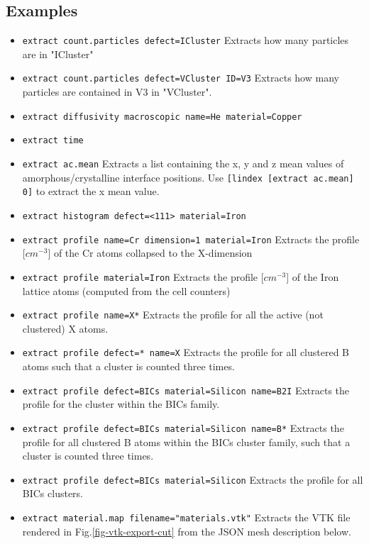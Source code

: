 \subsection{Examples}
\begin{itemize}
\item \verb+extract count.particles defect=ICluster+ Extracts how many particles are in "ICluster"
\item \verb+extract count.particles defect=VCluster ID=V3+ Extracts how many particles are contained in V3 in "VCluster".
\item \verb+extract diffusivity macroscopic name=He material=Copper+
\item \verb+extract time+
\item \verb+extract ac.mean+ Extracts a list containing the x, y and z mean values of amorphous/crystalline interface positions. Use \verb+[lindex [extract ac.mean] 0]+ to extract the x mean value.
\item \verb+extract histogram defect=<111> material=Iron+ 
\item \verb+extract profile name=Cr dimension=1 material=Iron+ Extracts the profile [$cm^{-3}$] of the Cr atoms collapsed to the X-dimension
\item \verb+extract profile material=Iron+ Extracts the profile [$cm^{-3}$] of the Iron lattice atoms (computed from the cell counters)
\item \verb+extract profile name=X*+ Extracts the profile for all the active (not clustered) X atoms.
\item \verb+extract profile defect=* name=X+ Extracts the profile for all clustered B atoms such that a  cluster is counted three times.
\item \verb+extract profile defect=BICs material=Silicon name=B2I+ Extracts the profile for the  cluster within the BICs family.
\item \verb+extract profile defect=BICs material=Silicon name=B*+ Extracts the profile for all clustered B atoms within the BICs cluster family, such that a  cluster is counted three times.
\item \verb+extract profile defect=BICs material=Silicon+ Extracts the profile for all BICs clusters.
\item \verb+extract material.map filename="materials.vtk"+ Extracts the VTK file rendered in Fig.\ref{fig-vtk-export-cut} from the JSON mesh description below.
\end{itemize}

